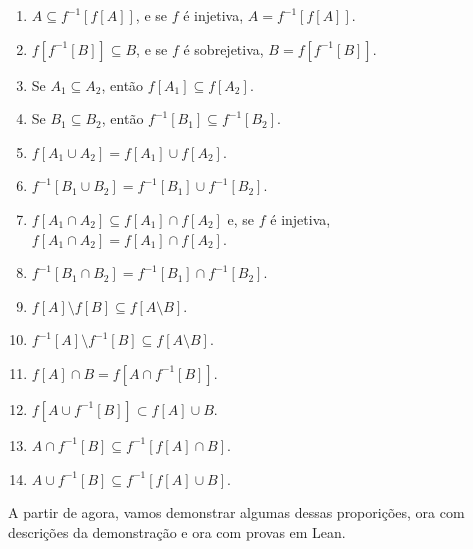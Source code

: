 \begin{enumerate}
    \item $A \subseteq f^{-1}[f[A]]$, e se $f$ é injetiva, $A = f^{-1}[f[A]]$.
    \item $f[f^{-1}[B]] \subseteq B$, e se $f$ é sobrejetiva, $B = f[f^{-1}[B]]$.
    \item Se $A_1 \subseteq A_2$, então $f[A_1] \subseteq f[A_2]$.
    \item Se $B_1 \subseteq B_2$, então $f^{-1}[B_1] \subseteq f^{-1}[B_2]$.
    \item $f[A_1 \cup A_2] = f[A_1] \cup f[A_2]$.
    \item $f^{-1}[B_1 \cup B_2] = f^{-1}[B_1] \cup f^{-1}[B_2]$.
    \item $f[A_1 \cap A_2] \subseteq f[A_1] \cap f[A_2]$ e, se $f$ é injetiva, $f[A_1 \cap A_2] = f[A_1] \cap f[A_2]$.
    \item $f^{-1}[B_1 \cap B_2] = f^{-1}[B_1] \cap f^{-1}[B_2]$.
    \item $f[A] \setminus f[B] \subseteq f[A\setminus B]$.
    \item $f^{-1}[A] \setminus f^{-1}[B] \subseteq f[A \setminus B]$.
    \item $f[A] \cap B = f[A \cap f^{-1}[B]]$.
    \item $f[A \cup f^{-1}[B]] \subset f[A] \cup B $.
    \item $A \cap f^{-1}[B] \subseteq f^{-1}[f[A] \cap B]$.
    \item $A \cup f^{-1}[B] \subseteq f^{-1}[f[A] \cup B]$.
\end{enumerate}

A partir de agora, vamos demonstrar algumas dessas proporições, ora
com descrições da demonstração e ora com provas em Lean.
